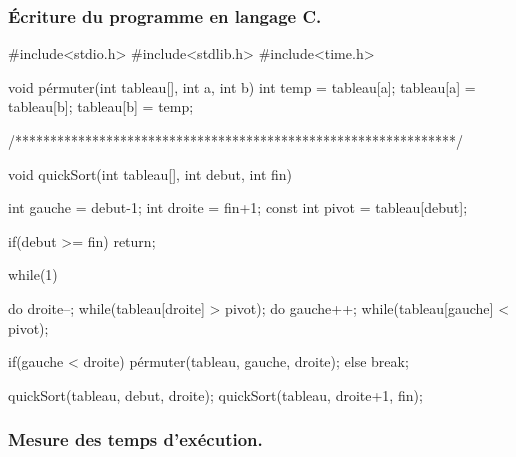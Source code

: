 \documentclass[12pt]{article}
\begin{document}
\subsubsection{Écriture du programme en langage C.}
\begin{sql}
#include<stdio.h>
#include<stdlib.h>
#include<time.h>
		
	void pérmuter(int tableau[], int a, int b)
	{
		int temp = tableau[a];
		tableau[a] = tableau[b];
		tableau[b] = temp;
	}
				
	/***************************************************************/

	void quickSort(int tableau[], int debut, int fin)
	{
		int gauche = debut-1;
		int droite = fin+1;
		const int pivot = tableau[debut];

		if(debut >= fin)
		return;

		while(1)
		{
			do droite--; while(tableau[droite] > pivot);
			do gauche++; while(tableau[gauche] < pivot);

			if(gauche < droite)
				pérmuter(tableau, gauche, droite);
				else break;
		}

		quickSort(tableau, debut, droite);
		quickSort(tableau, droite+1, fin);
	}
\end{sql}

\subsubsection{Mesure des temps d'exécution.}
\end{document}
